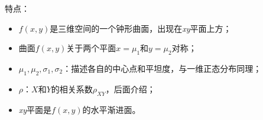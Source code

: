 特点：
\begin{itemize}
    \item $f\left( x,y \right) $是三维空间的一个钟形曲面，出现在\textit{xy}平面上方；
    \item 曲面$f\left( x,y \right) $关于两个平面$x=\mu _1$和$y=\mu _2$对称；
    \item $\mu _1,\mu _2,\sigma _1,\sigma _2$：描述各自的中心点和平坦度，与一维正态分布同理；
    \item $\rho $：$X$和$Y$的相关系数$\rho _{XY}$，后面介绍；
    \item \textit{xy}平面是$f\left( x,y \right) $的水平渐进面。
\end{itemize}




